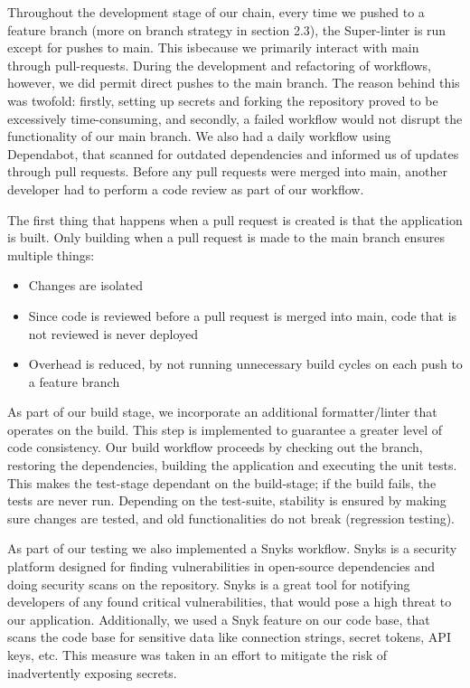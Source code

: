 Throughout the development stage of our chain, every time we pushed to a feature branch (more on branch strategy in section 2.3), the Super-linter is run except for pushes to main. This isbecause we primarily interact with main through pull-requests. During the development and refactoring of workflows, however, we did permit direct pushes to the main branch. The reason behind this was twofold: firstly, setting up secrets and forking the repository proved to be excessively time-consuming, and secondly, a failed workflow would not disrupt the functionality of our main branch. 
We also had a daily workflow using Dependabot, that scanned for outdated dependencies and informed us of updates through pull requests. Before any pull requests were merged into main, another developer had to perform a code review as part of our workflow. 

The first thing that happens when a pull request is created is that the application is built. Only building when a pull request is made to the main branch ensures multiple things:

\begin{itemize}
    \item Changes are isolated
    \item Since code is reviewed before a pull request is merged into main, code that is not reviewed is never deployed
    \item Overhead is reduced, by not running unnecessary build cycles on each push to a feature branch
\end{itemize}

As part of our build stage, we incorporate an additional formatter/linter that operates on the build. This step is implemented to guarantee a greater level of code consistency. Our build workflow proceeds by checking out the branch, restoring the dependencies, building the application and executing the unit tests. This makes the test-stage dependant on the build-stage; if the build fails, the tests are never run. Depending on the test-suite, stability is ensured by making sure changes are tested, and old functionalities do not break (regression testing).

As part of our testing we also implemented a Snyks workflow. Snyks is a security platform designed for finding vulnerabilities in open-source dependencies and doing security scans on the repository. Snyks is a great tool for notifying developers of any found critical vulnerabilities, that would pose a high threat to our application. Additionally, we used a Snyk feature on our code base, that scans the code base for sensitive data like connection strings, secret tokens, API keys, etc. This measure was taken in an effort to mitigate the risk of inadvertently exposing secrets.

